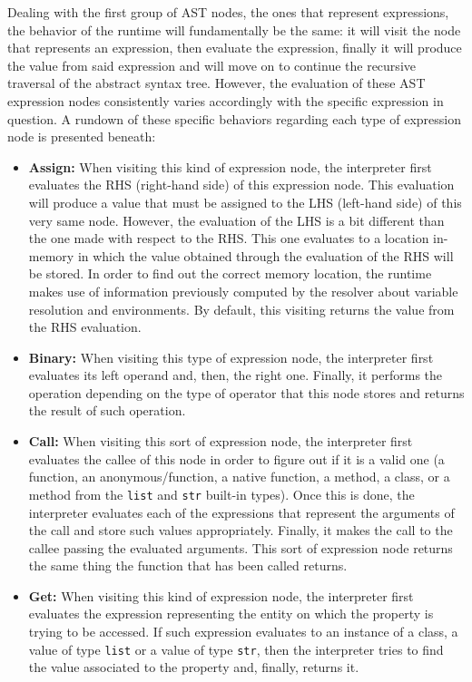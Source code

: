 Dealing with the first group of AST nodes, the ones that represent expressions, the behavior of the runtime will fundamentally be the same: it will visit the node that represents an expression, then evaluate the expression, finally it will produce the value from said expression and will move on to continue the recursive traversal of the abstract syntax tree. 
However, the evaluation of these AST expression nodes consistently varies accordingly with the specific expression in question. A rundown of these specific behaviors regarding each type of expression node is presented beneath:
\begin{itemize}
    \item \textbf{Assign:} When visiting this kind of expression node, the interpreter first evaluates the RHS (right-hand side) of this expression node. This evaluation will produce a value that must be assigned to the LHS (left-hand side) of this very same node. However, the evaluation of the LHS is a bit different than the one made with respect to the RHS. This one evaluates to a location in-memory in which the value obtained through the evaluation of the RHS will be stored. In order to find out the correct memory location, the runtime makes use of information previously computed by the resolver about variable resolution and environments. By default, this visiting returns the value from the RHS evaluation.
    \item \textbf{Binary:} When visiting this type of expression node, the interpreter first evaluates its left operand and, then, the right one. Finally, it performs the operation depending on the type of operator that this node stores and returns the result of such operation.
    \item \textbf{Call:} When visiting this sort of expression node, the interpreter first evaluates the callee of this node in order to figure out if it is a valid one (a function, an anonymous/function, a native function, a method, a class, or a method from the \texttt{list} and \texttt{str} built-in types). Once this is done, the interpreter evaluates each of the expressions that represent the arguments of the call and store such values appropriately. Finally, it makes the call to the callee passing the evaluated arguments. This sort of expression node returns the same thing the function that has been called returns.
    \item \textbf{Get:} When visiting this kind of expression node, the interpreter first evaluates the expression representing the entity on which the property is trying to be accessed. If such expression evaluates to an instance of a class, a value of type \texttt{list} or a value of type \texttt{str}, then the interpreter tries to find the value associated to the property and, finally, returns it.

\end{itemize}
